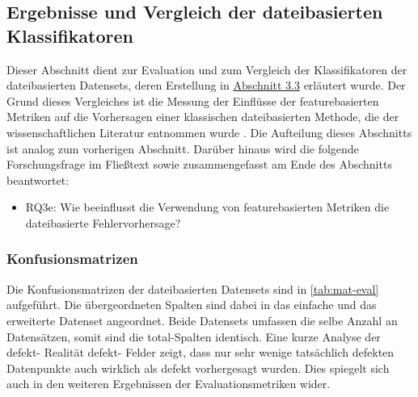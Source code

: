 
\subsection{Ergebnisse und Vergleich der dateibasierten Klassifikatoren}
\label{classic-eval}

Dieser Abschnitt dient zur Evaluation und zum Vergleich der Klassifikatoren der dateibasierten Datensets, deren Erstellung in \hyperref[new-datasets]{Abschnitt 3.3} erläutert wurde. Der Grund dieses Vergleiches ist die Messung der Einflüsse der featurebasierten Metriken auf die Vorhersagen einer klassischen dateibasierten Methode, die der wissenschaftlichen Literatur entnommen wurde \cite{Moser2008}. Die Aufteilung dieses Abschnitts ist analog zum vorherigen Abschnitt. Darüber hinaus wird die folgende Forschungsfrage im Fließtext sowie zusammengefasst am Ende des Abschnitts beantwortet:
\vspace{-\topsep}
\begin{itemize}
\setlength{\itemsep}{-2pt}
 \item RQ3e: Wie beeinflusst die Verwendung von featurebasierten Metriken die dateibasierte Fehlervorhersage?
\end{itemize} 

\subsubsection*{Konfusionsmatrizen}

Die Konfusionsmatrizen der dateibasierten Datensets sind in \autoref{tab:mat-eval} aufgeführt. Die übergeordneten Spalten sind dabei in das \glqq einfache\grqq{} und das erweiterte Datenset angeordnet. Beide Datensets umfassen die selbe Anzahl an Datensätzen, somit sind die \glqq total\grqq -Spalten identisch.
Eine kurze Analyse der \glqq defekt\grqq - \glqq Realität defekt\grqq - Felder zeigt, dass nur sehr wenige tatsächlich defekten Datenpunkte auch wirklich als defekt vorhergesagt wurden. Dies spiegelt sich auch in den weiteren Ergebnissen der Evaluationsmetriken wider.

